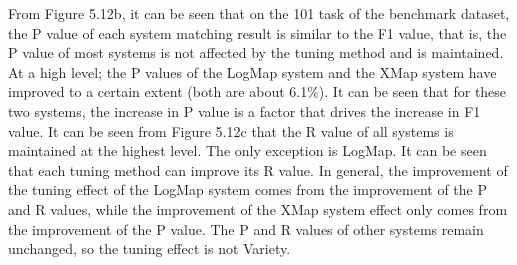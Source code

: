 \documentclass[twoside]{article}
\begin{document}
From Figure 5.12b, it can be seen that on the 101 task of the benchmark dataset, the P value of each system matching result is similar to the F1 value, that is, the P value of most systems is not affected by the tuning method and is maintained.
At a high level; the P values of the LogMap system and the XMap system have improved to a certain extent (both are about 6.1\%). It can be seen that for these two systems, the increase in P value is a factor that drives the increase in F1 value.
It can be seen from Figure 5.12c that the R value of all systems is maintained at the highest level. The only exception is LogMap. It can be seen that each tuning method can improve its R value.
In general, the improvement of the tuning effect of the LogMap system comes from the improvement of the P and R values, while the improvement of the XMap system effect only comes from the improvement of the P value. The P and R values of other systems remain unchanged, so the tuning effect is not Variety.
\end{document}
